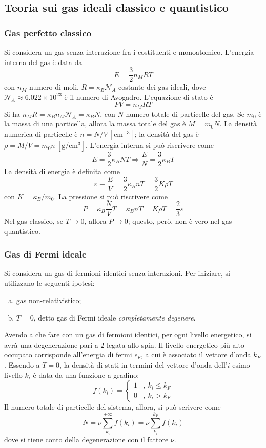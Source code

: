 \documentclass[11pt, a4paper]{scrartcl}
\theoremstyle{style}
\numberwithin{equation}{subsection}
\begin{document}
\subsection{Teoria sui gas ideali classico e quantistico}

\subsubsection{Gas perfetto classico}

Si considera un gas senza interazione fra i costituenti e monoatomico.
L'energia interna del gas \`e data da
\[
E = \frac{3}{2} n_M R T
\] 
con $n_M$ numero di moli, $R=\kappa _B \mathcal{N}_A$ costante dei gas ideali, dove $\mathcal{N} _A \approx 6.022 \times 10^{23}$ \`e il numero di Avogadro.
L'equazione di stato \`e 
\[
PV = n_M RT
\] 
Si ha $n_M R = \kappa _B n_M \mathcal{N} _A = \kappa _B N$, con $N$ numero totale di particelle del gas.
Se $m_0$ \`e la massa di una particella, allora la massa totale del gas \`e $M = m_0 N$.
La densit\`a numerica di particelle \`e $n = N / V~[\text{cm}^{-3}]$; la densit\`a del gas \`e $\rho  = M / V=m_0n~[\text{g}/\text{cm}^3]$.
L'energia interna si pu\`o riscrivere come
\[
E = \frac{3}{2} \kappa _B N T \Rightarrow  \frac{E}{N} = \frac{3}{2} \kappa _B T
\] 
La densit\`a di energia \`e definita come
\[
\varepsilon \equiv \frac{E}{V} = \frac{3}{2} \kappa _B n T = \frac{3}{2} K \rho  T
\] 
con $K = \kappa _B / m_0$.
La pressione si pu\`o riscrivere come 
\[
P = \kappa _B \frac{N}{V} T = \kappa _B n T = K \rho  T = \frac{2}{3} \varepsilon 
\] 
Nel gas classico, se $T\to 0$, allora $P\to 0$; questo, per\`o, non \`e vero nel gas quantistico.

\subsubsection{Gas di Fermi ideale}

Si considera un gas di fermioni identici senza interazioni.
Per iniziare, si utilizzano le seguenti ipotesi:
\begin{enumerate}[(a).]
	\item gas non-relativistico;
	\item $T = 0$, detto gas di Fermi ideale \textit{completamente degenere}.
\end{enumerate}
Avendo a che fare con un gas di fermioni identici, per ogni livello energetico, si avr\`a una degenerazione pari a $2$ legata allo spin.
Il livello energetico pi\`u alto occupato corrisponde all'energia di fermi $\epsilon _F$, a cui \`e associato il vettore d'onda $k_F$.
Essendo a $T=0$, la densit\`a di stati in termini del vettore d'onda dell'$i$-esimo livello $k_i$ \`e data da una funzione a gradino:
\[
f(k_i) = \begin{cases}
	1 &,\ k_i \le k_F\\
	0 &,\ k_i > k_F
\end{cases}
\] 
Il numero totale di particelle del sistema, allora, si pu\`o scrivere come
\[
N = \nu \sum_{k_i}^{+\infty} f(k_i) = \nu \sum_{k_i}^{k_F} f(k_i) 
\] 
dove si tiene conto della degenerazione con il fattore $\nu $.
\end{document}
